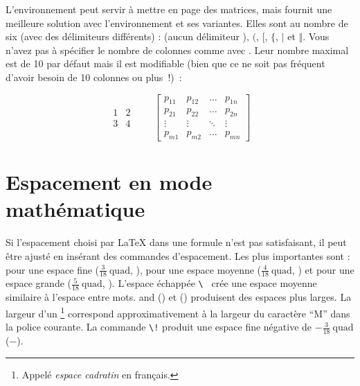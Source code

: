 L'environnement  peut servir à mettre en page des
matrices, mais  fournit une meilleure
solution avec l'environnement  et ses variantes. Elles sont au
nombre de six (avec des délimiteurs différents) :  (aucun
délimiteur ), 
$($,  $[$,  $\{$,  $\vert$ et
 $\Vert$. Vous n'avez pas à spécifier le nombre de
colonnes comme avec . Leur nombre maximal est de 10 par défaut mais il
est modifiable (bien que ce ne soit pas fréquent d'avoir besoin de 10
colonnes ou plus~!)~:
\begin{example}
\begin{equation*}
  \begin{matrix}
    1 & 2 \\
    3 & 4
  \end{matrix} \qquad
  \begin{bmatrix}
    p_{11} & p_{12} & \ldots
    & p_{1n} \\
    p_{21} & p_{22} & \ldots
    & p_{2n} \\
    \vdots & \vdots & \ddots
    & \vdots \\
    p_{m1} & p_{m2} & \ldots
    & p_{mn}
  \end{bmatrix}
\end{equation*}
\end{example}

\section{Espacement en mode mathématique}
\label{sec:math-spacing}


Si l'espacement choisi par \LaTeX{} dans une formule n'est pas
satisfaisant, il peut être ajusté en insérant des commandes
d'espacement. Les plus importantes sont : \ci{,} pour une espace fine
($\frac{3}{18}\:\textrm{quad}$, \demowidth{0.166em}), \ci{:} pour une
espace moyenne ($\frac{4}{18}\:\textrm{quad}$, \demowidth{0.222em}) et
\ci{;} pour une espace grande ($\frac{5}{18}\: \textrm{quad}$,
\demowidth{0.277em}).  L'espace échappée \verb*|\ | crée une espace
moyenne similaire à l'espace entre mots. and 
(\demowidth{1em}) et  (\demowidth{2em}) produisent des
espaces plus larges.  La largeur d'un \footnote{Appelé \emph{espace
    cadratin} en français. \NdT} correspond approximativement à la largeur du
caractère \enquote{M} dans la police courante.
La commande \verb|\!| produit une espace fine négative
de $-\frac{3}{18}\:\textrm{quad}$ ($-$\demowidth{0.166em}).

